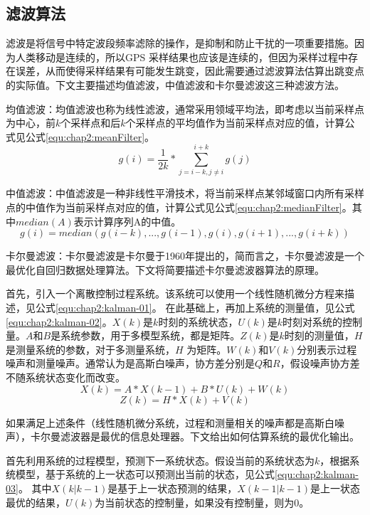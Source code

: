 \subsection{滤波算法}
\label{sec:section2-1-1}
滤波是将信号中特定波段频率滤除的操作，是抑制和防止干扰的一项重要措施。因为人类移动是连续的，所以GPS 采样结果也应该是连续的，但因为采样过程中存在误差，从而使得采样结果有可能发生跳变，因此需要通过滤波算法估算出跳变点的实际值。下文主要描述均值滤波，中值滤波和卡尔曼滤波这三种滤波方法。
\par 均值滤波：均值滤波也称为线性滤波，通常采用领域平均法，即考虑以当前采样点为中心，前$k$个采样点和后$k$个采样点的平均值作为当前采样点对应的值，计算公式见公式\ref{equ:chap2:meanFilter}。
\begin{equation}
\label{equ:chap2:meanFilter}
g(i)=\frac{1}{2k} \ast \sum_{j=i-k,j\neq i}^{i+k}g(j)
\end{equation}
\par 中值滤波：中值滤波是一种非线性平滑技术，将当前采样点某邻域窗口内所有采样点的中值作为当前采样点对应的值，计算公式见公式\ref{equ:chap2:medianFilter}。其中$median(A)$表示计算序列A的中值。
\begin{equation}
\label{equ:chap2:medianFilter}
g(i)=median({g(i-k),...,g(i-1),g(i),g(i+1),...,g(i+k)})
\end{equation}
\par 卡尔曼滤波：卡尔曼滤波是卡尔曼于1960年提出的，简而言之，卡尔曼滤波是一个最优化自回归数据处理算法。下文将简要描述卡尔曼滤波器算法的原理。
\par 首先，引入一个离散控制过程系统。该系统可以使用一个线性随机微分方程来描述，见公式\ref{equ:chap2:kalman-01}。 在此基础上，再加上系统的测量值，见公式\ref{equ:chap2:kalman-02}。$X(k)$是$k$时刻的系统状态，$U(k)$是$k$时刻对系统的控制量。$A$和$B$是系统参数，用于多模型系统，都是矩阵。$Z(k)$是$k$时刻的测量值，$H$是测量系统的参数，对于多测量系统，$H$ 为矩阵。$W(k)$和$V(k)$分别表示过程噪声和测量噪声。通常认为是高斯白噪声，协方差分别是$Q$和$R$，假设噪声协方差不随系统状态变化而改变。
\begin{equation}
\label{equ:chap2:kalman-01}
X(k)=A \ast X(k-1)+B \ast U(k)+W(k)
\end{equation}
\begin{equation}
\label{equ:chap2:kalman-02}
Z(k)=H \ast X(k)+V(k)
\end{equation}
\par 如果满足上述条件（线性随机微分系统，过程和测量相关的噪声都是高斯白噪声），卡尔曼滤波器是最优的信息处理器。下文给出如何估算系统的最优化输出。
\par 首先利用系统的过程模型，预测下一系统状态。假设当前的系统状态为$k$，根据系统模型，基于系统的上一状态可以预测出当前的状态，见公式\ref{equ:chap2:kalman-03}。 其中$X(k|k-1)$是基于上一状态预测的结果，$X(k-1|k-1)$是上一状态最优的结果，$U(k)$为当前状态的控制量，如果没有控制量，则为0。
